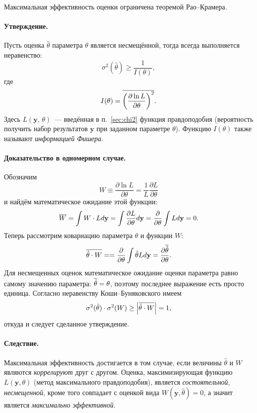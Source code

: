 Максимальная эффективность оценки ограничена теоремой Рао--Крамера.
\paragraph{Утверждение.}
Пусть оценка $\hat\theta$ параметра $\theta$ является несмещённой, тогда
всегда выполняется неравенство:
\begin{equation}
  \sigma^2(\hat\theta) \geq \frac{1}{I(\theta)},
\end{equation}
где
\begin{equation}
    I(\theta) =
    \overline{\left(\frac{\partial \ln L}{\partial \theta}\right)^2}.
\end{equation}
Здесь $L(\mathbf{y},\,\theta)$~--- введённая в п.~\ref{sec:chi2} функция правдоподобия
(вероятность получить набор результатов $\mathbf{y}$ при заданном параметре
$\theta$). Функцию $I(\theta)$ также называют \emph{информацией Фишера}.

\paragraph{Доказательство в одномерном случае.}
Обозначим
\[
W \equiv \frac{\partial \ln L} {\partial \theta} =
\frac{1}{L}\frac{\partial L}{\partial \theta}
\]
и найдём математическое ожидание этой функции:
\[
\overline{W} =
\int W\cdot L  d\mathbf{y} =
\int \frac{\partial L}{\partial \theta} d\mathbf{y} =
\frac{\partial}{\partial \theta} \int{L d\mathbf{y}} = 0.
\]
Теперь рассмотрим ковариацию параметра $\theta$ и функции
$W$:
\begin{equation}
\overline{\hat\theta\cdot W} =
= \frac{\partial}{\partial \theta} \int{\hat\theta L d\mathbf{y}} =
\frac{\partial \overline{\hat\theta}}{\partial \theta}.
\end{equation}
Для несмещенных оценок математическое ожидание оценки параметра равно
самому значению параметра: $\overline{\hat{\theta}} = \theta$,
поэтому последнее выражение есть просто единица.
Согласно неравенству Коши--Буняковского имеем
\[
\sigma^2 (\hat\theta) \cdot \sigma^2 (W) \geq
\left| \overline{\hat\theta \cdot W} \right| = 1,
\]
откуда и следует сделанное утверждение.

\paragraph{Следствие.}
Максимальная эффективность достигается в том случае, если величины
$\hat\theta$ и $W$ являются \emph{коррелируют} друг с другом.
Оценка, максимизирующая функцию $L(\mathbf{y},\theta)$
(метод максимального правдоподобия), является \emph{состоятельной},
\emph{несмещенной}, кроме того совпадает с оценкой вида
$W(\mathbf{y}, \hat\theta) = 0$, а значит является \emph{максимально эффективной}.

